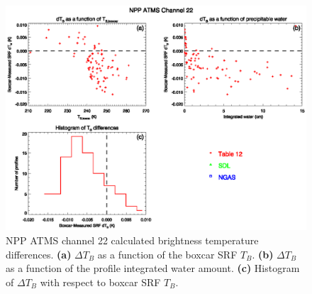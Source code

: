\begin{figure}[H]
  \centering
  \includegraphics[scale=1]{graphics/dtb/atms_npp.ch22.TbStats.eps}
  \caption{NPP ATMS channel 22 calculated brightness temperature differences. \textbf{(a)} $\Delta T_B$ as a function of the boxcar SRF $T_B$. \textbf{(b)} $\Delta T_B$ as a function of the profile integrated water amount. \textbf{(c)} Histogram of $\Delta T_B$ with respect to boxcar SRF $T_B$.}
  \label{fig:atms_npp.ch22.dtb}
\end{figure}
